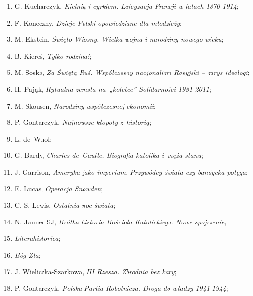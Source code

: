 \documentclass[a4paper,11pt]{article}
\begin{document}
\begin{enumerate}
\item G. Kucharczyk, \textit{Kielnią i cyrklem. Laicyzacja Francji w
    latach 1870-1914};

\item F. Koneczny, \textit{Dzieje Polski opowiedziane dla młodzieży};

\item M. Ekstein, \textit{Święto Wiosny. Wielka wojna i narodziny nowego
    wieku};

\item B. Kiereś, \textit{Tylko rodzina!};

\item M. Soska, \textit{Za Świętą Ruś. Współczesny nacjonalizm Rosyjski
    -- zarys ideologi};

\item H. Pająk, \textit{Rytualna zemsta na~„kolebce” Solidarności
    1981-2011};

\item M. Skousen, \textit{Narodziny współczesnej ekonomii};

\item P. Gontarczyk, \textit{Najnowsze kłopoty z~historią};

\item L. de~Whol;

\item G. Bardy, \textit{Charles de~Gaulle. Biografia katolika i~męża
    stanu};

\item J. Garrison, \textit{Ameryka jako imperium. Przywódcy świata czy
    bandycka potęga};

\item E. Lucas, \textit{Operacja Snowden};

\item C. S. Lewis, \textit{Ostatnia noc świata};

\item N. Janner SJ, \textit{Krótka historia Kościoła Katolickiego. Nowe
    spojrzenie};

\item \textit{Literahistorica};

\item \textit{Bóg Zła};

\item J. Wieliczka-Szarkowa, \textit{III Rzesza. Zbrodnia bez kary};

\item P. Gontarczyk, \textit{Polska Partia Robotnicza. Droga do władzy
    1941-1944};


\end{enumerate}
\end{document}
